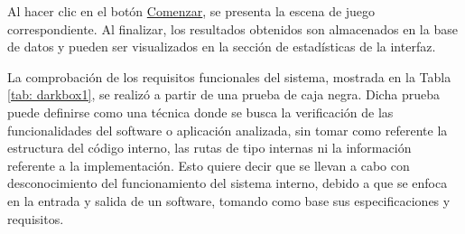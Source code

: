 Al hacer clic en el botón \underline{Comenzar}, se presenta la escena de juego correspondiente. Al finalizar, los resultados obtenidos son almacenados en la base de datos y pueden ser visualizados en la sección de estadísticas de la interfaz. 

La comprobación de los requisitos funcionales del sistema, mostrada en la Tabla \ref{tab: darkbox1}, se realizó a partir de una prueba de caja negra. Dicha prueba puede definirse como una técnica donde se busca la verificación de las funcionalidades del software o aplicación analizada, sin tomar como referente la estructura del código interno, las rutas de tipo internas ni la información referente a la implementación. Esto quiere decir que se llevan a cabo con desconocimiento del funcionamiento del sistema interno, debido a que se enfoca en la entrada y salida de un software, tomando como base sus especificaciones y requisitos.    


